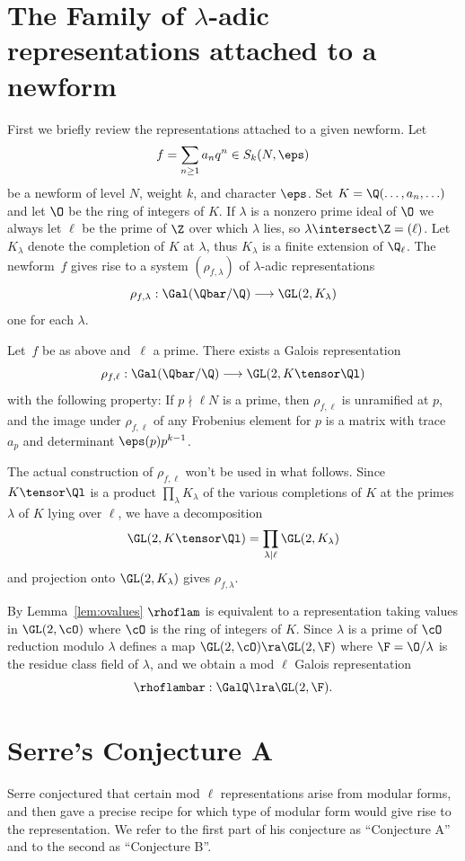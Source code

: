 \documentclass{report}
\begin{document}
\section{The Family of $\lambda$-adic representations attached to
 a newform}
First we briefly review the representations attached to a given newform.
Let
$$f=\sum_{n\geq 1} a_n q^n \in S_k(N,\eps)$$
be a newform of level $N$, weight $k$, and character $\eps$.
Set $K=\Q(\ldots,a_n,\ldots)$ and let $\O$ be the ring of integers
of $K$.  If $\lambda$ is a nonzero prime ideal of $\O$ we always let
$\ell$ be the prime of $\Z$ over which $\lambda$ lies,
so $\lambda\intersect\Z = (\ell)$.
Let $K_{\lambda}$ denote the completion of $K$ at $\lambda$, thus
$K_{\lambda}$ is a finite extension of $\Q_\ell$.
The newform~$f$ gives  rise to a system $(\rho_{f,\lambda})$
of $\lambda$-adic representations
$$\rho_{f,\lambda}:\Gal(\Qbar/\Q) \longrightarrow \GL(2,K_{\lambda})$$
one for each $\lambda$.
\begin{theorem}
Let~$f$ be as above and~$\ell$ a prime.
There exists a Galois representation
$$\rho_{f,\ell}:\Gal(\Qbar/\Q)\longrightarrow\GL(2,K\tensor\Ql)$$
with the following property:
If $p\nmid \ell N$ is a prime, then $\rho_{f,\ell}$ is
unramified at $p$, and the image under $\rho_{f,\ell}$
of any Frobenius element for $p$ is a matrix with trace
$a_p$ and determinant $\eps(p) p^{k-1}$.
\end{theorem}
The actual construction of $\rho_{f,\ell}$  won't be used in what follows.
Since $K\tensor\Ql$ is a product $\prod_{\lambda} K_{\lambda}$ of
the various completions of $K$ at the primes $\lambda$ of $K$ lying
over $\ell$, we have a decomposition
$$\GL(2,K\tensor\Ql) = \prod_{\lambda|\ell} \GL(2,K_{\lambda})$$
and projection onto $\GL(2,K_{\lambda})$ gives $\rho_{f,\lambda}$.

By Lemma~\ref{lem:ovalues} $\rhoflam$ is equivalent to
a representation taking values in $\GL(2,\cO)$ where
$\cO$ is the ring of integers of $K$.  Since $\lambda$ is
a prime of $\cO$ reduction modulo $\lambda$ defines a map
$\GL(2,\cO)\ra\GL(2,\F)$ where $\F=\O/\lambda$ is the
residue class field of $\lambda$, and we obtain
a mod $\ell$ Galois representation
$$\rhoflambar: \GalQ \lra \GL(2,\F).$$

\section{Serre's Conjecture A}
Serre \cite{serre:conjectures}
conjectured that certain mod $\ell$ representations arise
from modular forms, and then gave a precise recipe
for which type of modular form would give rise to the representation.
We refer to the first part of his conjecture as ``Conjecture A'' and
to the second as ``Conjecture B''.
\end{document}
